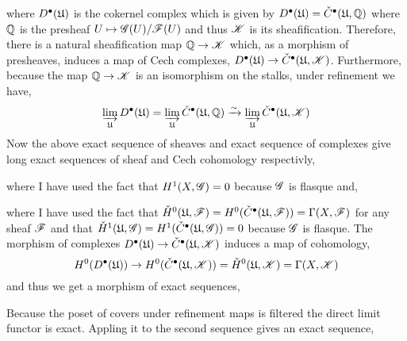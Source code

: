 \documentclass[12pt]{article}
\begin{document}
\begin{enumerate}
where $D^\bullet(\mathfrak{U})$ is the cokernel complex which is given by $D^\bullet(\mathfrak{U}) = \check{C}^\bullet(\mathfrak{U}, \mathbb{Q})$ where $\mathbb{Q}$ is the presheaf $U \mapsto \mathscr{G}(U) / \mathscr{F}(U)$ and thus $\mathscr{K}$ is its sheafification. Therefore, there is a natural sheafification map $\mathbb{Q} \to \mathscr{K}$ which, as a morphism of presheaves, induces a map of Cech complexes, $D^\bullet(\mathfrak{U}) \to \check{C}^\bullet(\mathfrak{U}, \mathscr{K})$. Furthermore, because the map $\mathbb{Q} \to \mathscr{K}$ is an isomorphism on the stalks, under refinement we have,
\[ \varinjlim_{\mathfrak{U}} D^\bullet(\mathfrak{U}) = \varinjlim_{\mathfrak{U}} \check{C}^\bullet(\mathfrak{U}, \mathbb{Q}) \xrightarrow{\sim} \varinjlim_{\mathfrak{U}} \check{C}^\bullet(\mathfrak{U}, \mathscr{K}) \]
Now the above exact sequence of sheaves and exact sequence of complexes give long exact sequences of sheaf and Cech cohomology respectivly,
\begin{center}
\end{center}
where I have used the fact that $H^1(X, \mathscr{G}) = 0$ because $\mathscr{G}$ is flasque and, 
\begin{center}
\end{center}
where I have used the fact that $\check{H}^0(\mathfrak{U}, \mathscr{F}) = H^0(\check{C}^\bullet(\mathfrak{U}, \mathscr{F})) = \Gamma(X, \mathscr{F})$ for any sheaf $\mathscr{F}$ and that $\check{H}^1(\mathfrak{U}, \mathscr{G}) = H^1(\check{C}^\bullet(\mathfrak{U}, \mathscr{G})) = 0$ because $\mathscr{G}$ is flasque. The morphism of complexes $D^\bullet(\mathfrak{U}) \to \check{C}^\bullet(\mathfrak{U}, \mathscr{K})$ induces a map of cohomology,
\[ H^0(D^\bullet(\mathfrak{U})) \to H^0(\check{C}^\bullet(\mathfrak{U}, \mathscr{K})) = \check{H}^0(\mathfrak{U}, \mathscr{K}) = \Gamma(X, \mathscr{K}) \]
and thus we get a morphism of exact sequences,
\begin{center}
\end{center}
Because the poset of covers under refinement maps is filtered the direct limit functor is exact. Appling it to the second sequence gives an exact sequence,

\end{enumerate}
\end{document}
